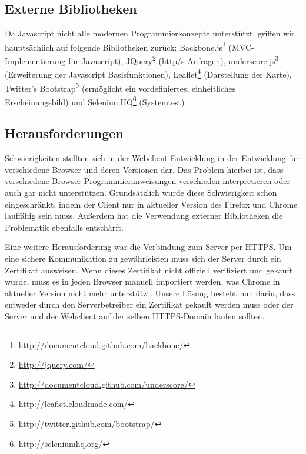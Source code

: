 \subsection*{Externe Bibliotheken}

Da Javascript nicht alle modernen Programmierkonzepte unterstützt, griffen wir hauptsächlich auf folgende Bibliotheken zurück:
Backbone.js\footnote{\url{http://documentcloud.github.com/backbone/}} (MVC-Implementierung für Javascript), 
JQuery\footnote{\url{http://jquery.com/}} (http/s Anfragen), 
underscore.js\footnote{\url{http://documentcloud.github.com/underscore/}} (Erweiterung der Javascript Basisfunktionen),
Leaflet\footnote{\url{http://leaflet.cloudmade.com/}} (Darstellung der Karte),  
Twitter's Bootstrap\footnote{\url{http://twitter.github.com/bootstrap/}} (ermöglicht ein vordefiniertes, einheitliches Erscheinungsbild) und
SeleniumHQ\footnote{\url{http://seleniumhq.org/}} (Systemtest)

\subsection*{Herausforderungen}

Schwierigkeiten stellten sich in der Webclient-Entwicklung in der Entwicklung für verschiedene Browser und deren Versionen dar.
Das Problem hierbei ist, dass verschiedene Browser Programmieranweisungen verschieden interpretieren oder auch gar nicht unterstützen. 
Grundsätzlich wurde diese Schwierigkeit schon eingeschränkt, indem der Client nur in aktueller Version des Firefox und Chrome lauffähig sein muss. Außerdem hat die Verwendung externer Bibliotheken die Problematik ebenfalls entschärft.

Eine weitere Herausforderung war die Verbindung zum Server per HTTPS.
Um eine sichere Kommunikation zu gewährleisten muss sich der Server durch ein Zertifikat ausweisen.
Wenn dieses Zertifikat nicht offiziell verifiziert und gekauft wurde, muss es in jeden Browser manuell importiert werden, was Chrome in aktueller Version nicht mehr unterstützt.
Unsere Lösung besteht nun darin, dass entweder durch den Serverbetreiber ein Zertifikat gekauft werden muss oder der Server und der Webclient auf der selben HTTPS-Domain laufen sollten.